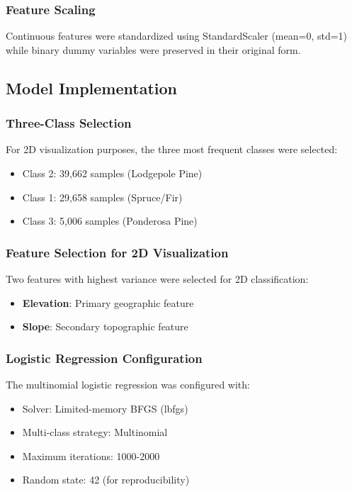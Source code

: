\documentclass[12pt,a4paper]{article}
\begin{document}
\subsubsection{Feature Scaling}
Continuous features were standardized using StandardScaler (mean=0, std=1) while binary dummy variables were preserved in their original form.

\subsection{Model Implementation}

\subsubsection{Three-Class Selection}
For 2D visualization purposes, the three most frequent classes were selected:
\begin{itemize}
    \item Class 2: 39,662 samples (Lodgepole Pine)
    \item Class 1: 29,658 samples (Spruce/Fir)
    \item Class 3: 5,006 samples (Ponderosa Pine)
\end{itemize}

\subsubsection{Feature Selection for 2D Visualization}
Two features with highest variance were selected for 2D classification:
\begin{itemize}
    \item \textbf{Elevation}: Primary geographic feature
    \item \textbf{Slope}: Secondary topographic feature
\end{itemize}

\subsubsection{Logistic Regression Configuration}
The multinomial logistic regression was configured with:
\begin{itemize}
    \item Solver: Limited-memory BFGS (lbfgs)
    \item Multi-class strategy: Multinomial
    \item Maximum iterations: 1000-2000
    \item Random state: 42 (for reproducibility)
\end{itemize}
\end{document}

